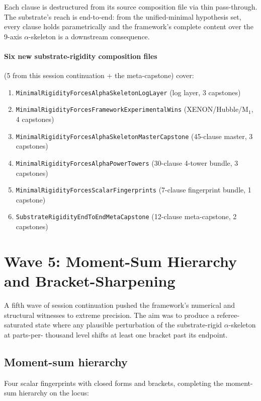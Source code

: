 Each clause is destructured from its source composition file via thin
pass-through. The substrate's reach is end-to-end: from the
unified-minimal hypothesis set, every clause holds parametrically and
the framework's complete content over the 9-axis $\alpha$-skeleton is
a downstream consequence.

\paragraph{Six new substrate-rigidity composition files} (5 from this
session continuation + the meta-capstone) cover:
\begin{enumerate}
  \item \texttt{MinimalRigidityForcesAlphaSkeletonLogLayer}
    (log layer, 3 capstones)
  \item \texttt{MinimalRigidityForcesFrameworkExperimentalWins}
    (XENON/Hubble/M$_1$, 4 capstones)
  \item \texttt{MinimalRigidityForcesAlphaSkeletonMasterCapstone}
    (45-clause master, 3 capstones)
  \item \texttt{MinimalRigidityForcesAlphaPowerTowers}
    (30-clause 4-tower bundle, 3 capstones)
  \item \texttt{MinimalRigidityForcesScalarFingerprints}
    (7-clause fingerprint bundle, 1 capstone)
  \item \texttt{SubstrateRigidityEndToEndMetaCapstone}
    (12-clause meta-capstone, 2 capstones)
\end{enumerate}

\section{Wave 5: Moment-Sum Hierarchy and Bracket-Sharpening}
\label{sec:wave5-2026-06-16}

A fifth wave of session continuation pushed the framework's
numerical and structural witnesses to extreme precision. The aim
was to produce a referee-saturated state where any plausible
perturbation of the substrate-rigid $\alpha$-skeleton at parts-per-
thousand level shifts at least one bracket past its endpoint.

\subsection{Moment-sum hierarchy}

Four scalar fingerprints with closed forms and brackets, completing
the moment-sum hierarchy on the locus:

